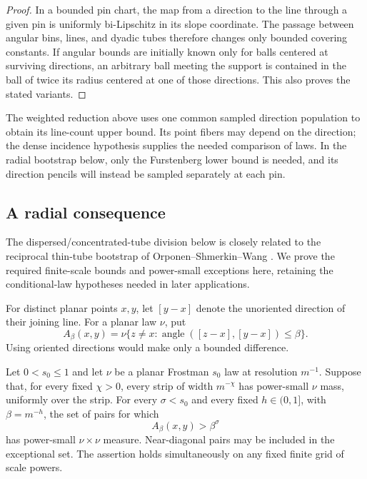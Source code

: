 \begin{proof}
In a bounded pin chart, the map from a direction to the line through a
given pin is uniformly bi-Lipschitz in its slope coordinate. The passage
between angular bins, lines, and dyadic tubes therefore changes only
bounded covering constants. If angular bounds are initially known only
for balls centered at surviving directions, an arbitrary ball meeting
the support is contained in the ball of twice its radius centered at
one of those directions. This also proves the stated variants.
\end{proof}

The weighted reduction above uses one common sampled direction
population to obtain its line-count upper bound. Its point fibers
may depend on the direction; the dense incidence hypothesis supplies
the needed comparison of laws. In the radial bootstrap below, only
the Furstenberg lower bound is needed, and its direction pencils
will instead be sampled separately at each pin.

\subsection{A radial consequence}

The dispersed/concentrated-tube division below is closely related to
the reciprocal thin-tube bootstrap of Orponen--Shmerkin--Wang
\cite[arXiv:2209.00348v1, Section~1.3, Lemma~2.8, and
Corollary~2.18]{OrponenShmerkinWang2024Radial}.  We prove the required
finite-scale bounds and power-small exceptions here, retaining the
conditional-law hypotheses needed in later applications.

For distinct planar points $x,y$, let $[y-x]$ denote the unoriented
direction of their joining line. For a planar law $\nu$, put
\[
 A_\beta(x,y)
 =\nu\{z\ne x:\operatorname{angle}([z-x],[y-x])\le\beta\}.
\]
Using oriented directions would make only a bounded difference.

\begin{lemma}
\label{proj:radial}
Let $0<s_0\le1$ and let $\nu$ be a planar Frostman $s_0$ law at
resolution $m^{-1}$. Suppose that, for every fixed $\chi>0$, every
strip of width $m^{-\chi}$ has power-small $\nu$ mass, uniformly over
the strip. For every $\sigma<s_0$ and every fixed $h\in(0,1]$, with
$\beta=m^{-h}$, the set of pairs for which
\[
 A_\beta(x,y)>\beta^\sigma
\]
has power-small $\nu\times\nu$ measure. Near-diagonal pairs may be
included in the exceptional set. The assertion holds simultaneously
on any fixed finite grid of scale powers.
\end{lemma}

